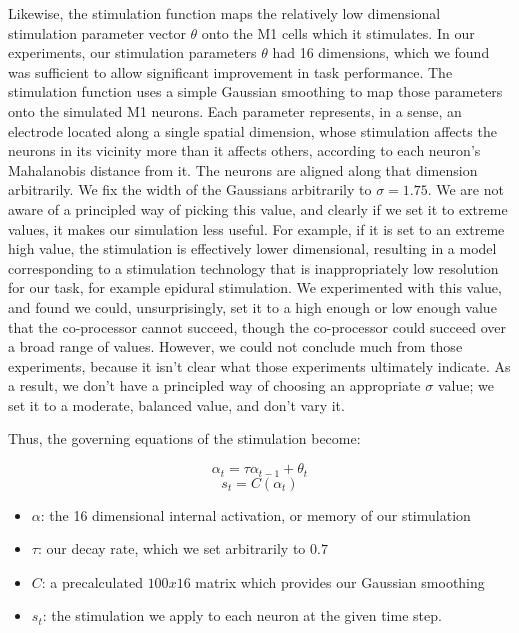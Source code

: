 \documentclass[12pt]{iopart}
\begin{document}
Likewise, the stimulation function maps the relatively low dimensional stimulation
parameter vector $\theta$ onto the M1 cells which it stimulates. In our experiments,
our stimulation parameters $\theta$ had 16 dimensions, which we found was
sufficient to allow significant improvement in task performance. The stimulation
function uses a simple Gaussian smoothing to map those parameters onto the simulated
M1 neurons. Each parameter represents, in a sense, an electrode located along a single
spatial dimension, whose stimulation affects the neurons in its vicinity more than
it affects others, according to each neuron's Mahalanobis distance from it. The neurons
are aligned along that dimension arbitrarily. We fix the width of the Gaussians
arbitrarily to $\sigma=1.75$. We are not aware of a principled way of picking this
value, and clearly if we set it to extreme values, it makes our simulation less useful.
For example, if it is set to an extreme high value, the stimulation is effectively
lower dimensional, resulting in a model corresponding to a stimulation technology that
is inappropriately low resolution for our task, for example epidural stimulation.
We experimented with this value, and found we could, unsurprisingly, set it to a high
enough or low enough value that the co-processor cannot succeed, though the co-processor
could succeed over a broad range of values. However, we could not conclude much from
those experiments, because it isn't clear what those experiments ultimately indicate.
As a result, we don't have a principled way of choosing an appropriate $\sigma$ value;
we set it to a moderate, balanced value, and don't vary it.

Thus, the governing equations of the stimulation become:

\begin{equation}
\alpha_{t} = \tau\alpha_{t-1} + \theta_{t}
\end{equation}
\begin{equation}
s_{t} = C(\alpha_{t})
\end{equation}

\begin{itemize}
	\item $\alpha$: the 16 dimensional internal activation, or memory
        of our stimulation
	\item $\tau$: our decay rate, which we set arbitrarily to $0.7$
	\item $C$: a precalculated $100 x 16$ matrix which provides our
	Gaussian smoothing
	\item $s_{t}$: the stimulation we apply to each neuron at the
	given time step.
\end{itemize}
\end{document}
